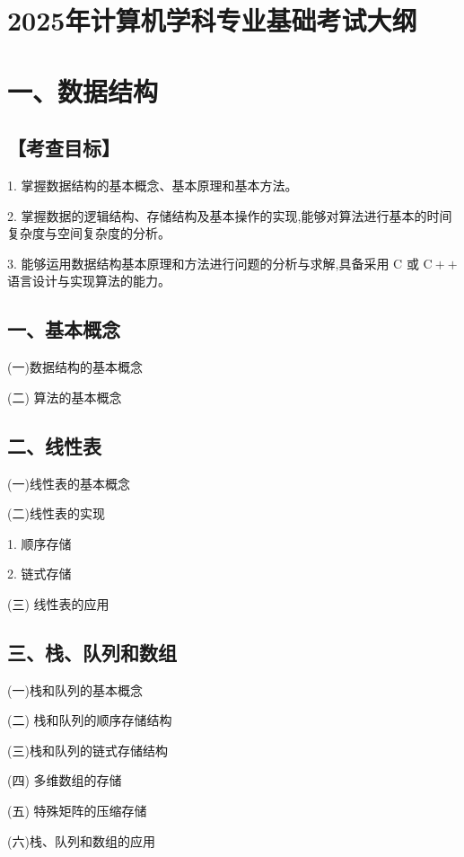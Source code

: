 \documentclass[10pt]{article}
\begin{document}
\section*{2025年计算机学科专业基础考试大纲}

\section*{一、数据结构}

\subsection*{【考查目标】}

1. 掌握数据结构的基本概念、基本原理和基本方法。

2. 掌握数据的逻辑结构、存储结构及基本操作的实现,能够对算法进行基本的时间复杂度与空间复杂度的分析。

3. 能够运用数据结构基本原理和方法进行问题的分析与求解,具备采用 \(\mathrm{C}\) 或 \(\mathrm{C} +  +\) 语言设计与实现算法的能力。

\subsection*{一、基本概念}

(一)数据结构的基本概念

(二) 算法的基本概念

\subsection*{二、线性表}

(一)线性表的基本概念 

(二)线性表的实现 

1. 顺序存储 

2. 链式存储 

(三) 线性表的应用

\subsection*{三、栈、队列和数组}

(一)栈和队列的基本概念

(二) 栈和队列的顺序存储结构

(三)栈和队列的链式存储结构

(四) 多维数组的存储

{\color{red} (五) 特殊矩阵的压缩存储}

(六)栈、队列和数组的应用
\end{document}
